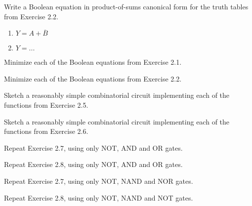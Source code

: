 \exercise %
Write a Boolean equation in product-of-sums canonical form
for the truth tables from Exercise 2.2.
\solution
\begin{enumerate}[label=(\alph*)]
\item $Y=A+\overline{B}$
\item $Y=...$	
\end{enumerate}

\exercise %
Minimize each of the Boolean equations from Exercise 2.1.
\solution
{}

\exercise %
Minimize each of the Boolean equations from Exercise 2.2.
\solution
{}

\exercise %
Sketch a reasonably simple combinatorial circuit implementing
each of the functions from Exercise 2.5.
\solution
{}

\exercise %
Sketch a reasonably simple combinatorial circuit implementing
each of the functions from Exercise 2.6.
\solution
{}

\exercise %
Repeat Exercise 2.7, using only NOT, AND and OR gates.
\solution
{}

\exercise %
Repeat Exercise 2.8, using only NOT, AND and OR gates.
\solution
{}

\exercise %
Repeat Exercise 2.7, using only NOT, NAND and NOR gates.
\solution
{}

\exercise %
Repeat Exercise 2.8, using only NOT, NAND and NOT gates.
\solution
{}







